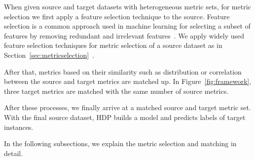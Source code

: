 When given source and target datasets with heterogeneous metric sets, for metric
selection we first apply a feature selection technique to the source. Feature
selection is a common approach used in machine learning for selecting a subset
of features by removing redundant and irrelevant features~\cite{Guyon03}.
We apply widely used feature selection
techniques for metric selection of a source dataset as in
Section~\ref{sec:metricselection}~\cite{Gao11,Shivaji13}.

After that, metrics based on their similarity such as distribution
or correlation between the source and target metrics are matched up. In
Figure~\ref{fig:framework}, three target metrics are matched with the
same number of source metrics.

After these processes, we finally
arrive at a matched source and target metric set. With the final
source dataset, HDP builds a model and predicts labels of
target instances.

In the following subsections, we explain the metric selection and matching in
detail.



